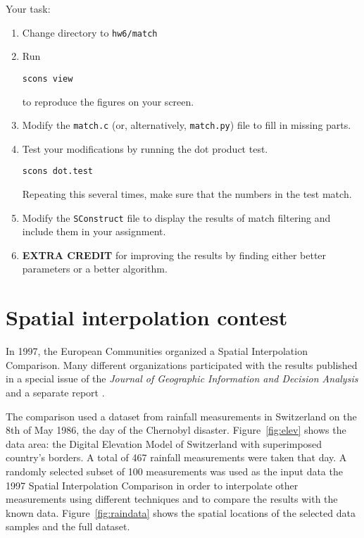 Your task:
\begin{enumerate}
\item Change directory to \texttt{hw6/match}
\item Run 
\begin{verbatim}
scons view
\end{verbatim}
to reproduce the figures on your screen.
\item Modify the \texttt{match.c} (or, alternatively, \texttt{match.py}) file to fill in missing parts.
\item Test your modifications by running the dot product test.
\begin{verbatim}
scons dot.test
\end{verbatim}
Repeating this several times, make sure that the numbers in the test match.
\item  Modify the \texttt{SConstruct} file to display the results of match filtering
and include them in your assignment.
\item \textbf{EXTRA CREDIT} for improving the results by finding either better parameters or a better algorithm. 
\end{enumerate}


\lstset{language=python,numbers=left,numberstyle=\tiny,showstringspaces=false}


\section{Spatial interpolation contest}

In 1997, the European Communities organized a Spatial Interpolation
Comparison. Many different organizations participated with the results
published in a special issue of the \emph{Journal of Geographic
Information and Decision Analysis} \cite[]{dubois} and a separate
report \cite[]{rain}.


The comparison used a dataset from rainfall measurements in
Switzerland on the 8th of May 1986, the day of the Chernobyl disaster.
Figure~\ref{fig:elev} shows the data area: the Digital Elevation Model
of Switzerland with superimposed country's borders.  A total of 467
rainfall measurements were taken that day. A randomly selected subset
of 100 measurements was used as the input data the 1997 Spatial
Interpolation Comparison in order to interpolate other measurements
using different techniques and to compare the results with the known
data. Figure~\ref{fig:raindata} shows the spatial locations of the
selected data samples and the full dataset.

